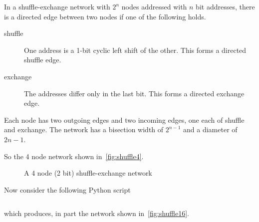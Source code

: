 \documentclass{article}
\begin{document}
    In a shuffle-exchange network with $2^n$ nodes addressed with $n$ bit addresses, there is a directed edge between two nodes if one of the following holds.

    \begin{description}
        \item[shuffle] One address is a 1-bit cyclic left shift of the other. This forms a directed shuffle edge.
        \item[exchange] The addresses differ only in the last bit. This forms a directed exchange edge.
    \end{description}

    Each node has two outgoing edges and two incoming edges, one each of shuffle and exchange. The network has a bisection width of $2^{n - 1}$ and a diameter of $2n - 1$.

    So the 4 node network shown in~\autoref{fig:shuffle4}.

    \begin{figure}
        \centering
        \caption{A 4 node (2 bit) shuffle-exchange network}\label{fig:shuffle4}
    \end{figure}

    Now consider the following Python script \inputminted{python}{prob6.py}

    which produces, in part the network shown in~\autoref{fig:shuffle16}.
\end{document}
